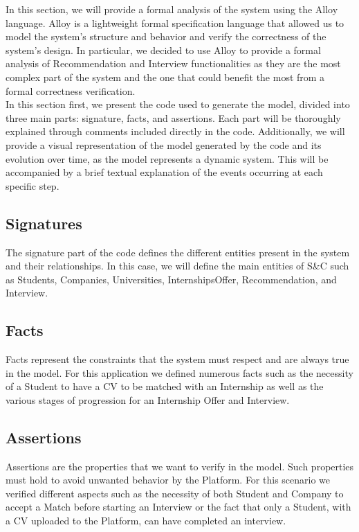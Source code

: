 In this section, we will provide a formal analysis of the system using the Alloy language. Alloy is a lightweight formal specification language that allowed us to model the system's structure and behavior and verify the correctness of the system's design. In particular, we decided to use Alloy to provide a formal analysis of Recommendation and Interview functionalities as they are the most complex part of the system and the one that could benefit the most from a formal correctness verification.\\
In this section first, we present the code used to generate the model, divided into three main parts: signature, facts, and assertions. Each part will be thoroughly explained through comments included directly in the code. Additionally, we will provide a visual representation of the model generated by the code and its evolution over time, as the model represents a dynamic system. This will be accompanied by a brief textual explanation of the events occurring at each specific step.\\


\subsection{Signatures}
The signature part of the code defines the different entities present in the system and their relationships. In this case, we will define the main entities of S\&C such as Students, Companies, Universities, InternshipsOffer, Recommendation, and Interview. 


\subsection{Facts}
Facts represent the constraints that the system must respect and are always true in the model. For this application we defined numerous facts such as the necessity of a Student to have a CV to be matched with an Internship as well as the various stages of progression for an Internship Offer and Interview.


\subsection{Assertions}
Assertions are the properties that we want to verify in the model. Such properties must hold to avoid unwanted behavior by the Platform. For this scenario we verified different aspects such as the necessity of both Student and Company to accept a Match before starting an Interview or the fact that only a Student, with a CV uploaded to the Platform, can have completed an interview.

